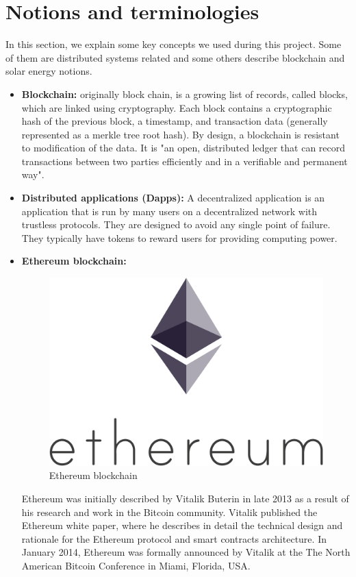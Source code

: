 \section{Notions and terminologies}
    In this section, we explain some key concepts we used during this project. Some of them
    are distributed systems related and some others describe blockchain and solar energy notions.
    \begin{itemize}

        \item \textbf{Blockchain:}
        originally block chain, is a growing list of records, called blocks, which are linked using cryptography.
        Each block contains a cryptographic hash of the previous block, a timestamp, and transaction data (generally
        represented as a merkle tree root hash). By design, a blockchain is resistant to modification of the
        data. It is "an open, distributed ledger that can record transactions between two parties efficiently
        and in a verifiable and permanent way".

        \item \textbf{Distributed applications (Dapps):}
        A decentralized application is an application that is run by many users on a decentralized network
        with trustless protocols. They are designed to avoid any single point of failure. They typically have
        tokens to reward users for providing computing power.

        \item \textbf{Ethereum blockchain:}

        \begin{figure}[!h]\centering
            \includegraphics[width=.3\columnwidth]{3-State-of-the-art/figs/ethereum.png}
            \caption{Ethereum blockchain}
        \end{figure}
        
        Ethereum\cite{ethereum} was initially described by Vitalik Buterin\cite{v-buterin} in late 2013
        as a result of his research and work in the Bitcoin community. Vitalik published the Ethereum
        white paper, where he describes in detail the technical design and rationale for the Ethereum
        protocol and smart contracts architecture. In January 2014, Ethereum was formally announced by
        Vitalik at the The North American Bitcoin Conference in Miami, Florida, USA.


\end{itemize}
